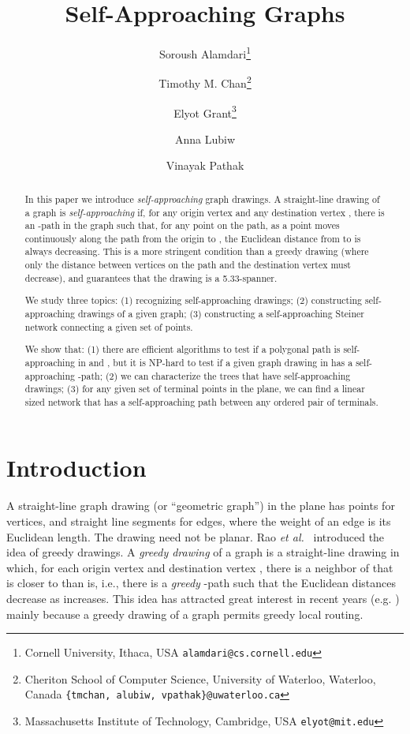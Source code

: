 \documentclass[11pt]{article}
\newcommand{\etal}{{\em et al.~}}
\begin{document}
\title{ Self-Approaching Graphs}

\author{
Soroush Alamdari\thanks{Cornell University, Ithaca, USA {\tt alamdari@cs.cornell.edu}}
\and
Timothy M. Chan\thanks{Cheriton School of Computer Science, University of Waterloo, Waterloo, Canada
    {\tt \{tmchan, alubiw, vpathak\}@uwaterloo.ca}}
\and
Elyot Grant\thanks{Massachusetts Institute of Technology, Cambridge, USA {\tt elyot@mit.edu}}
\and
Anna Lubiw\footnotemark[2]\and
Vinayak Pathak\footnotemark[2]
}



\maketitle


\begin{abstract}
In this paper we introduce \emph{self-approaching}  graph drawings. A straight-line drawing of a graph is \emph{self-approaching} if, for any origin vertex  and any destination vertex , there is an -path in the graph such that,
for any point  on the path,
as a point  moves continuously along the path from the origin to , the  Euclidean distance  from  to  is always decreasing.
This is a more stringent condition than a greedy drawing (where only the distance between vertices on the path and the destination vertex must decrease), and guarantees that the drawing is a 5.33-spanner.

We study three topics:
(1) recognizing self-approaching drawings;
(2) constructing self-approaching drawings of a given graph;
(3) constructing a self-approaching Steiner network connecting a given set of points.

We show that: (1) there are efficient algorithms to test if a polygonal path is self-approaching in  and ,
but it is NP-hard to test if a given graph drawing in  has a self-approaching -path;
(2)
we can characterize the trees that have self-approaching drawings;
(3) for any given set of terminal points in the plane, we can find a linear sized network that has a self-approaching path between any ordered pair of terminals.



\end{abstract}



\section{Introduction}
A straight-line graph drawing (or ``geometric graph'') in the plane has points for vertices, and straight line segments for edges, where the weight of an edge is its Euclidean length.  The drawing need not be planar.
Rao \etal\cite{Rao:GeoRouting:2003} introduced the idea of greedy drawings.  A \emph{greedy drawing} of a graph is a straight-line drawing in which, for each origin vertex  and destination vertex , there is a neighbor of  that is closer to  than  is, i.e., there is a \emph{greedy} -path  such that the Euclidean distances  decrease as  increases.
This idea has attracted great interest in recent years (e.g. \cite{Angelini:2009,Bose:theta6:2012,Goodrich:2008,He:2011,Leighton:2010,Papadimitriou:2005}) mainly because a greedy drawing of a graph permits greedy local routing.
\end{document}
